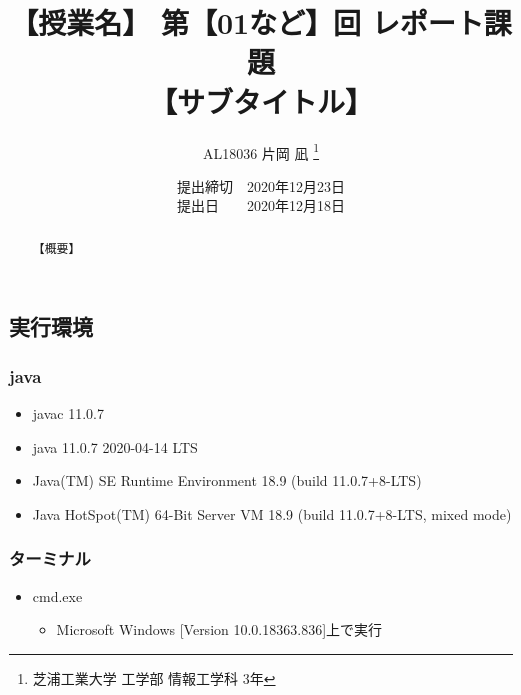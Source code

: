 \documentclass[a4paper, papersize]{jsarticle}
\title{
\vspace{-2cm} %
【授業名】 第【01など】回 レポート課題 \\
【サブタイトル】}
\author{AL18036 片岡 凪 \thanks{芝浦工業大学 工学部 情報工学科 3年}}
\date{提出締切　2020年12月23日 \\
提出日　　2020年12月18日}
\begin{document}
\maketitle


\setcounter{tocdepth}{2}
\tableofcontents
\newpage


\begin{abstract}
【概要】
\end{abstract}


\begin{multicols}{2}
\setcounter{section}{-1}


\section{実行環境}
\subsubsection{java}
\begin{itemize}
\item javac 11.0.7
\item java 11.0.7 2020-04-14 LTS
\item Java(TM) SE Runtime Environment 18.9 (build 11.0.7+8-LTS)
\item Java HotSpot(TM) 64-Bit Server VM 18.9 (build 11.0.7+8-LTS, mixed mode)
\end{itemize}


\subsubsection{ターミナル}
\begin{itemize}
\item cmd.exe
\begin{itemize}
\item Microsoft Windows [Version 10.0.18363.836]上で実行
\end{itemize}
\end{itemize}



\end{multicols}
\end{document}
